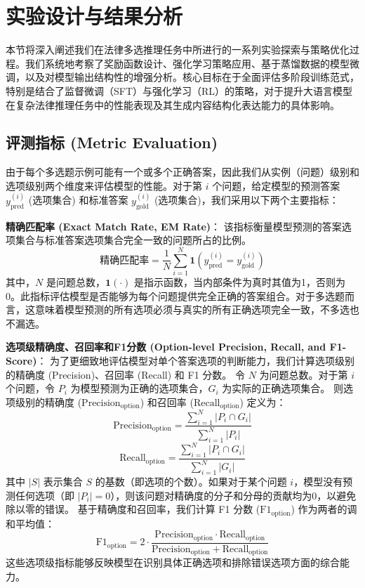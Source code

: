 \documentclass{article}
\begin{document}
\section{实验设计与结果分析}
\label{sec:experiments_results}

本节将深入阐述我们在法律多选推理任务中所进行的一系列实验探索与策略优化过程。我们系统地考察了奖励函数设计、强化学习策略应用、基于蒸馏数据的模型微调，以及对模型输出结构性的增强分析。核心目标在于全面评估多阶段训练范式，特别是结合了监督微调（SFT）与强化学习（RL）的策略，对于提升大语言模型在复杂法律推理任务中的性能表现及其生成内容结构化表达能力的具体影响。

\subsection{评测指标 (Metric Evaluation)}
\label{sec:metrics}
由于每个多选题示例可能有一个或多个正确答案，因此我们从实例（问题）级别和选项级别两个维度来评估模型的性能。对于第 $i$ 个问题，给定模型的预测答案 $y^{(i)}_{\text{pred}}$ (选项集合) 和标准答案 $y^{(i)}_{\text{gold}}$ (选项集合)，我们采用以下两个主要指标：

\textbf{精确匹配率 (Exact Match Rate, EM Rate)}：
该指标衡量模型预测的答案选项集合与标准答案选项集合完全一致的问题所占的比例。
$$ \text{精确匹配率} = \frac{1}{N} \sum_{i=1}^{N} \mathbf{1}(y^{(i)}_{\text{pred}} = y^{(i)}_{\text{gold}}) $$
其中，$N$ 是问题总数，$\mathbf{1}(\cdot)$ 是指示函数，当内部条件为真时其值为1，否则为0。此指标评估模型是否能够为每个问题提供完全正确的答案组合。对于多选题而言，这意味着模型预测的所有选项必须与真实的所有正确选项完全一致，不多选也不漏选。

\textbf{选项级精确度、召回率和F1分数 (Option-level Precision, Recall, and F1-Score)}：
为了更细致地评估模型对单个答案选项的判断能力，我们计算选项级别的精确度 (Precision)、召回率 (Recall) 和 F1 分数。
令 $N$ 为问题总数。对于第 $i$ 个问题，令 $P_i$ 为模型预测为正确的选项集合，$G_i$ 为实际的正确选项集合。
则选项级别的精确度 ($\text{Precision}_{\text{option}}$) 和召回率 ($\text{Recall}_{\text{option}}$) 定义为：
$$ \text{Precision}_{\text{option}} = \frac{\sum_{i=1}^N |P_i \cap G_i|}{\sum_{i=1}^N |P_i|} $$
$$ \text{Recall}_{\text{option}} = \frac{\sum_{i=1}^N |P_i \cap G_i|}{\sum_{i=1}^N |G_i|} $$
其中 $|S|$ 表示集合 $S$ 的基数（即选项的个数）。如果对于某个问题 $i$，模型没有预测任何选项（即 $|P_i|=0$），则该问题对精确度的分子和分母的贡献均为0，以避免除以零的错误。
基于精确度和召回率，我们计算 F1 分数 ($\text{F1}_{\text{option}}$) 作为两者的调和平均值：
$$ \text{F1}_{\text{option}} = 2 \cdot \frac{\text{Precision}_{\text{option}} \cdot \text{Recall}_{\text{option}}}{\text{Precision}_{\text{option}} + \text{Recall}_{\text{option}}} $$
这些选项级指标能够反映模型在识别具体正确选项和排除错误选项方面的综合能力。
\end{document}
